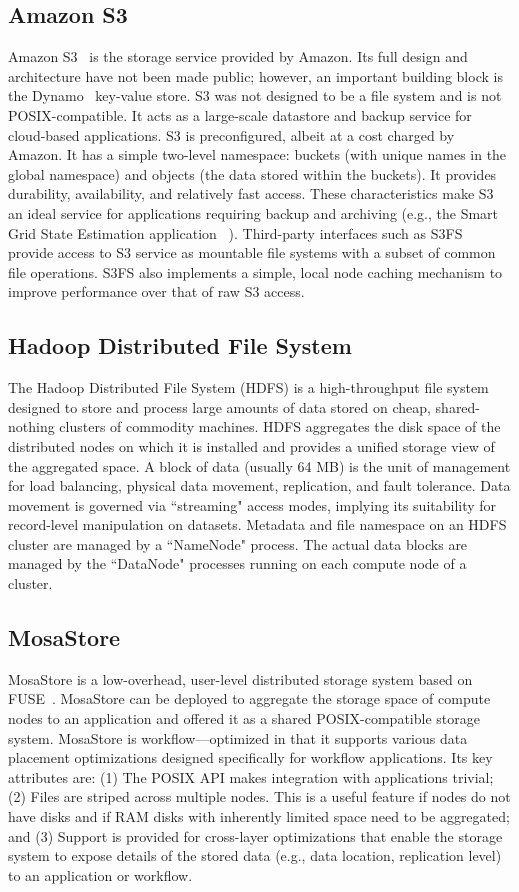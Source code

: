 \documentclass{sig-alternate}
\begin{document}
\subsection{Amazon S3} 
Amazon S3~\cite{s3_web} is the storage service provided by Amazon. Its full
design and architecture have not been made public; however, an important
building block is the Dynamo~\cite{dynamo} key-value store. S3 was not designed
to be a file system and is not POSIX-compatible.  It acts as a large-scale
datastore and backup service for cloud-based applications.
S3 is preconfigured, albeit at a cost charged by
Amazon. It has a simple two-level namespace: buckets (with unique names in the
global namespace) and objects (the data stored within the buckets). It provides
durability, availability, and relatively fast access. These characteristics
make S3 an ideal service for applications requiring backup and archiving (e.g.,
the Smart Grid State Estimation application ~\cite{maheshwari-lim-etal:2013}).
Third-party interfaces such as S3FS~\cite{s3fs_web} provide access to S3
service as mountable file systems with a subset of common file operations. S3FS
also implements a simple, local node caching mechanism to improve performance
over that of raw S3 access.

\subsection{Hadoop Distributed File System}
The Hadoop Distributed File System (HDFS) is a high-throughput file system
designed to store and process large amounts of data stored on cheap,
shared-nothing clusters of commodity machines. HDFS aggregates the disk space
of the distributed nodes on which it is installed and provides a unified
storage view of the aggregated space. A block of data (usually 64 MB) is the
unit of management for load balancing, physical data movement, replication, and
fault tolerance. Data movement is governed via ``streaming" access modes,
implying its suitability for record-level manipulation on datasets. Metadata
and file namespace on an HDFS cluster are managed by a ``NameNode" process. The
actual data blocks are managed by the ``DataNode" processes running on each
compute node of a cluster. 

\subsection{MosaStore}
MosaStore is a low-overhead, user-level distributed storage system based on
FUSE~\cite{fuse_web}. MosaStore can be deployed to aggregate the storage space
of compute nodes to an application and offered it as a shared POSIX-compatible
storage system.  MosaStore is workflow—optimized in that it supports various
data placement optimizations designed specifically for workflow applications.
Its key attributes are: (1) The POSIX API makes integration with applications
trivial; (2) Files are striped across multiple nodes. This is a useful feature
if nodes do not have disks and if RAM disks with inherently limited space need
to be aggregated; and (3) Support is provided for cross-layer optimizations
that enable the storage system to expose details of the stored data (e.g., data
location, replication level) to an application or workflow. 
\end{document}
